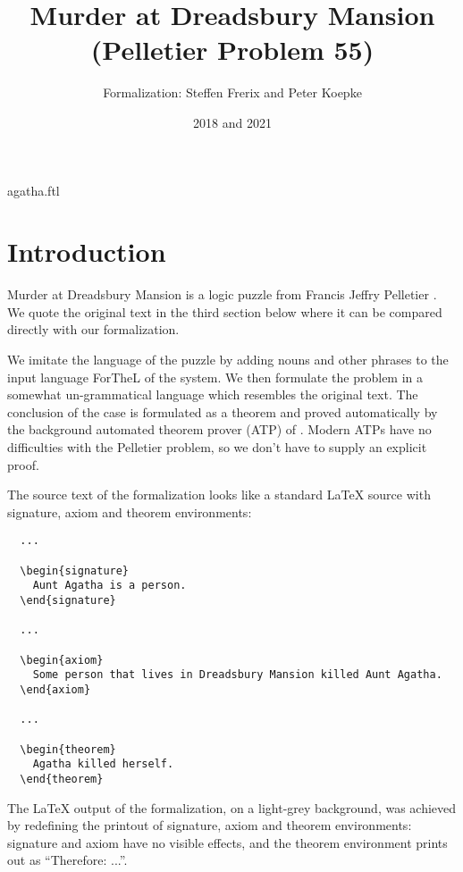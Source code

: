 \documentclass{article}
\title{Murder at Dreadsbury Mansion (Pelletier Problem 55)}
\author{\Naproche Formalization: Steffen Frerix and Peter Koepke}
\date{2018 and 2021}
\begin{document}
\maketitle

\begin{smodule}{agatha.ftl}
  \section{Introduction}

  Murder at Dreadsbury Mansion is a logic puzzle from Francis Jeffry Pelletier \cite{Pelletier1986}.
  We quote the original text in the third section below where it can be compared directly with our formalization.

  We imitate the language of the puzzle by adding nouns and other phrases to the input language ForTheL of the \Naproche system.
  We then formulate the problem in a somewhat un-grammatical language which resembles the original text.
  The conclusion of the case is formulated as a theorem and proved automatically by the background automated theorem prover (ATP) of \Naproche.
  Modern ATPs have no difficulties with the Pelletier problem, so we don't
  have to supply an explicit proof.

  The source text of the formalization looks like a standard \LaTeX{} source
  with signature, axiom and theorem environments:

  \begin{verbatim}
  ...

  \begin{signature}
    Aunt Agatha is a person.
  \end{signature}

  ...

  \begin{axiom}
    Some person that lives in Dreadsbury Mansion killed Aunt Agatha.
  \end{axiom}

  ...

  \begin{theorem}
    Agatha killed herself.
  \end{theorem}
  \end{verbatim}

  The \LaTeX{} output of the formalization, on a light-grey background, was
  achieved by redefining the printout of signature, axiom and theorem environments: signature and axiom have no visible effects, and the theorem environment prints out as “Therefore: ...”.



\end{smodule}
\end{document}
